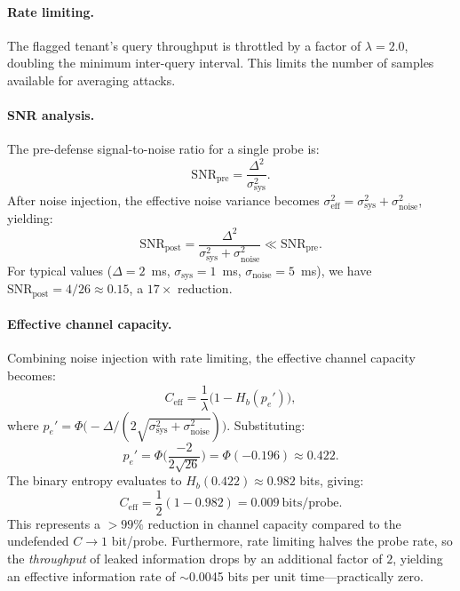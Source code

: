 \paragraph{Rate limiting.}
The flagged tenant's query throughput is throttled by a factor of $\lambda = 2.0$,
doubling the minimum inter-query interval. This limits the number of samples available
for averaging attacks.

\paragraph{SNR analysis.}
The pre-defense signal-to-noise ratio for a single probe is:
\begin{equation}
    \mathrm{SNR}_{\mathrm{pre}} = \frac{\Delta^2}{\sigma_{\mathrm{sys}}^2}.
\end{equation}
After noise injection, the effective noise variance becomes
$\sigma_{\mathrm{eff}}^2 = \sigma_{\mathrm{sys}}^2 + \sigma_{\mathrm{noise}}^2$, yielding:
\begin{equation}
    \mathrm{SNR}_{\mathrm{post}} = \frac{\Delta^2}{\sigma_{\mathrm{sys}}^2 + \sigma_{\mathrm{noise}}^2}
    \ll \mathrm{SNR}_{\mathrm{pre}}.
    \label{eq:snr-post}
\end{equation}
For typical values ($\Delta = 2$~ms, $\sigma_{\mathrm{sys}} = 1$~ms,
$\sigma_{\mathrm{noise}} = 5$~ms), we have
$\mathrm{SNR}_{\mathrm{post}} = 4 / 26 \approx 0.15$, a $17\times$ reduction.

\paragraph{Effective channel capacity.}
Combining noise injection with rate limiting, the effective channel capacity becomes:
\begin{equation}
    C_{\mathrm{eff}} = \frac{1}{\lambda}\big(1 - H_b(p_e')\big),
    \label{eq:effective-capacity}
\end{equation}
where $p_e' = \Phi\!\big(-\Delta / (2\sqrt{\sigma_{\mathrm{sys}}^2 + \sigma_{\mathrm{noise}}^2})\big)$.
Substituting:
\begin{equation}
    p_e' = \Phi\!\bigg(\frac{-2}{2\sqrt{26}}\bigg) = \Phi(-0.196) \approx 0.422.
\end{equation}
The binary entropy evaluates to $H_b(0.422) \approx 0.982$ bits, giving:
\begin{equation}
    C_{\mathrm{eff}} = \frac{1}{2}(1 - 0.982) = 0.009~\text{bits/probe}.
\end{equation}
This represents a $>99\%$ reduction in channel capacity compared to the undefended
$C \to 1$ bit/probe. Furthermore, rate limiting halves the probe rate, so the
\emph{throughput} of leaked information drops by an additional factor of $2$, yielding
an effective information rate of $\sim$0.0045 bits per unit time---practically zero.

